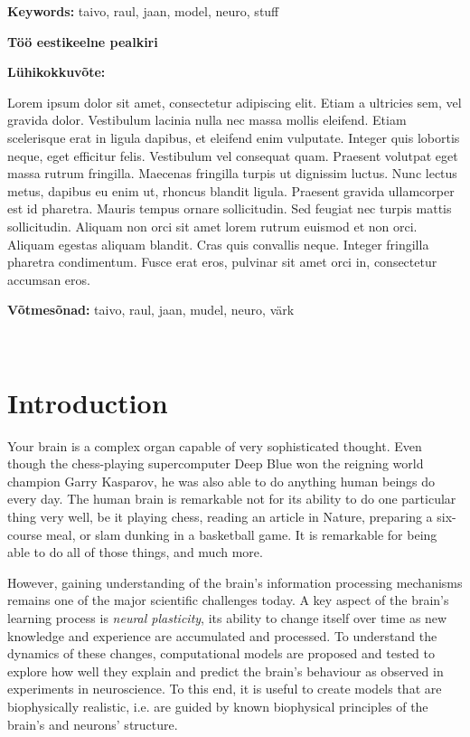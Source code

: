 \documentclass[a4paper,12pt]{report}
\theoremstyle{definition}
\begin{document}
\textbf{Keywords:} taivo, raul, jaan, model, neuro, stuff

\vspace{1.5cm}



{\textbf
{\Large Töö eestikeelne pealkiri}}

\textbf{Lühikokkuvõte:}

Lorem ipsum dolor sit amet, consectetur adipiscing elit. Etiam a ultricies sem, vel gravida dolor. Vestibulum lacinia nulla nec massa mollis eleifend. Etiam scelerisque erat in ligula dapibus, et eleifend enim vulputate. Integer quis lobortis neque, eget efficitur felis. Vestibulum vel consequat quam. Praesent volutpat eget massa rutrum fringilla. Maecenas fringilla turpis ut dignissim luctus. Nunc lectus metus, dapibus eu enim ut, rhoncus blandit ligula. Praesent gravida ullamcorper est id pharetra. Mauris tempus ornare sollicitudin. Sed feugiat nec turpis mattis sollicitudin. Aliquam non orci sit amet lorem rutrum euismod et non orci. Aliquam egestas aliquam blandit. Cras quis convallis neque. Integer fringilla pharetra condimentum. Fusce erat eros, pulvinar sit amet orci in, consectetur accumsan eros.

\textbf{Võtmesõnad:} taivo, raul, jaan, mudel, neuro, värk


\
\thispagestyle{empty}
\pagebreak

\tableofcontents
\newpage



\chapter*{Introduction}

Your brain is a complex organ capable of very sophisticated thought. Even though the chess-playing supercomputer Deep Blue won the reigning world champion Garry Kasparov, he was also able to do anything human beings do every day. The human brain is remarkable not for its ability to do one particular thing very well, be it playing chess, reading an article in Nature, preparing a six-course meal, or slam dunking in a basketball game. It is remarkable for being able to do all of those things, and much more.

However, gaining understanding of the brain's information processing mechanisms remains one of the major scientific challenges today. A key aspect of the brain's learning process is \emph{neural plasticity}, its ability to change itself over time as new knowledge and experience are accumulated and processed. To understand the dynamics of these changes, computational models are proposed and tested to explore how well they explain and predict the brain's behaviour as observed in experiments in neuroscience. To this end, it is useful to create models that are biophysically realistic, i.e. are guided by known biophysical principles of the brain's and neurons' structure.
\end{document}
